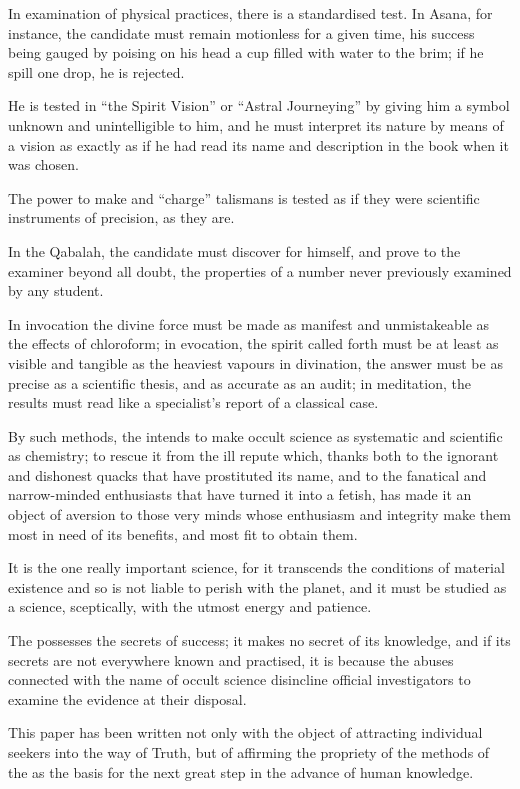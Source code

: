 In examination of physical practices, there is a standardised test.  In Asana, for instance, the candidate must remain motionless for a given time, his success being gauged by poising on his head a cup filled with water to the brim; if he spill one drop, he is rejected.

He is tested in \enquote{the Spirit Vision} or \enquote{Astral Journeying} by giving him a symbol unknown and unintelligible to him, and he must interpret its nature by means of a vision as exactly as if he had read its name and description in the book when it was chosen.

The power to make and \enquote{charge} talismans is tested as if they were scientific instruments of precision, as they are.

In the Qabalah, the candidate must discover for himself, and prove to the examiner beyond all doubt, the properties of a number never previously examined by any student.

In invocation the divine force must be made as manifest and unmistakeable as the effects of chloroform; in evocation, the spirit called forth must be at least as visible and tangible as the heaviest vapours in divination, the answer must be as precise as a scientific thesis, and as accurate as an audit; in meditation, the results must read like a specialist's report of a classical case.

By such methods, the \Argentium{} intends to make occult science as systematic and scientific as chemistry; to rescue it from the ill repute which, thanks both to the ignorant and dishonest quacks that have prostituted its name, and to the fanatical and narrow-minded enthusiasts that have turned it into a fetish, has made it an object of aversion to those very minds whose enthusiasm and integrity make them most in need of its benefits, and most fit to obtain them.

It is the one really important science, for it transcends the conditions of material existence and so is not liable to perish with the planet, and it must be studied as a science, sceptically, with the utmost energy and patience.

The \Argentium{} possesses the secrets of success; it makes no secret of its knowledge, and if its secrets are not everywhere known and practised, it is because the abuses connected with the name of occult science disincline official investigators to examine the evidence at their disposal.

This paper has been written not only with the object of attracting individual seekers into the way of Truth, but of affirming the propriety of the methods of the \Argentium{} as the basis for the next great step in the advance of human knowledge.

